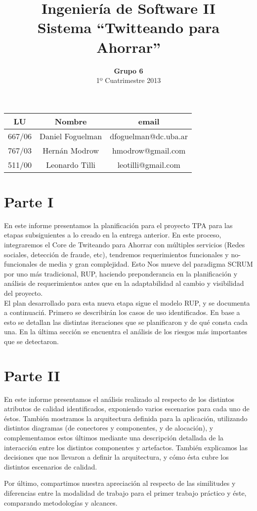 \documentclass[a4paper,spanish]{article}
\title{Ingenier\'ia de Software II\\ \textbf{Sistema ``Twitteando para Ahorrar''}}
\author{\textbf{Grupo 6}\\ 1º Cuatrimestre 2013}
\date{}
\begin{document}
\maketitle
\vspace{10cm}
\begin{center}

\begin{tabular}{|c|c|c|}
\hline
\hline
\textbf{LU}&\textbf{Nombre}&\textbf{email}\\
\hline
667/06&Daniel Foguelman &dfoguelman@dc.uba.ar\\
\hline
767/03&Hern\'an Modrow&hmodrow@gmail.com\\
\hline
511/00&Leonardo Tilli&leotilli@gmail.com\\
\hline
\hline
\end{tabular}
\end{center}
\newpage

\section{Parte I}

 En este informe presentamos la planificación para el proyecto TPA para las etapas subsiguientes a lo creado en la entrega anterior. En este proceso, integraremos el Core de Twiteando para Ahorrar con múltiples servicios (Redes sociales, detección de fraude, etc), tendremos requerimientos funcionales y no-funcionales de media y gran complejidad. Esto Nos mueve del paradigma SCRUM por uno más tradicional, RUP, haciendo preponderancia en la planificación y análisis de requerimientos antes que en la adaptabilidad al cambio y visibilidad del proyecto. \\

 El plan desarrollado para esta nueva etapa sigue el modelo RUP, y se documenta a continuaci\'n. Primero se describir\'an los casos de uso identificados. En base a esto se detallan las distintas iteraciones que se planificaron y de qu\'e consta cada una. En la \'ultima secci\'on se encuentra el an\'alisis de los riesgos m\'as importantes que se detectaron.






\section{Parte II}

 En este informe presentamos el an\'alisis realizado al respecto de los distintos atributos de calidad identificados, exponiendo varios escenarios para cada uno de \'estos. Tambi\'en mostramos la arquitectura definida para la aplicaci\'on, utilizando distintos diagramas (de conectores y componentes, y de alocaci\'on), y complementamos estos \'ultimos mediante una descripci\'on detallada de la interacci\'on entre los distintos componentes y artefactos. Tambi\'en explicamos las decisiones que nos llevaron a definir la arquitectura, y c\'omo \'esta cubre los distintos escenarios de calidad.
 
 Por \'ultimo, compartimos nuestra apreciaci\'on al respecto de las similitudes y diferencias entre la modalidad de trabajo para el primer trabajo pr\'actico y \'este, comparando metodolog\'ias y alcances.
 




\end{document}
